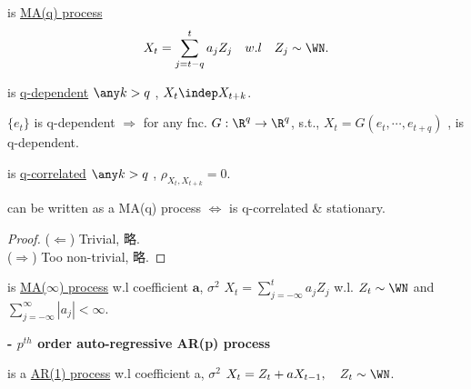 \begin{definition}
 is \uline{MA(q) process} \iff 
\[
    X_t = \sum_{j=t-q}^{t}a_j Z_j \quad w.l \quad Z_j \sim \WN.
\]
\end{definition}

\begin{definition}
 is \uline{q-dependent} \iff $\any k > q$ , $X_t \indep X_{t+k}$.
\end{definition}

\begin{property}
$\{e_t\}$ is q-dependent $\Rightarrow$ for any fnc. $G: \R^q \rightarrow \R^q$, s.t., $X_t = G(e_t, \cdots, e_{t+q})$ ,  is q-dependent.
\end{property}

\begin{definition}
 is \uline{q-correlated} \iff $\any k > q$ , $\rho_{X_t, X_{t+k}} = 0$.
\end{definition}

\begin{theorem}
 can be written as a MA(q) process $\Leftrightarrow$  is q-correlated \& stationary.
\end{theorem}

\begin{proof}
($\Leftarrow$) Trivial, 略.\\
($\Rightarrow$) Too non-trivial, 略.
\end{proof}

\begin{definition}
 is \uline{MA($\infty$) process} w.l coefficient $\bm{a}$, $\sigma^2$ \iff $X_t = \sum_{j = - \infty}^{t} a_j Z_j$ w.l. $Z_t \sim \WN$ and $\sum_{j = -\infty}^{\infty} |a_j| < \infty$.
\end{definition}
\vspace{1em}

\noindent \textbf{- $p^{th}$ order auto-regressive AR(p) process}

\begin{definition}
 is a \uline{ AR(1) process} w.l coefficient a, $\sigma^2$ \iff $X_t = Z_t + a X_{t-1}, \quad Z_t \sim \WN$.
\end{definition}


